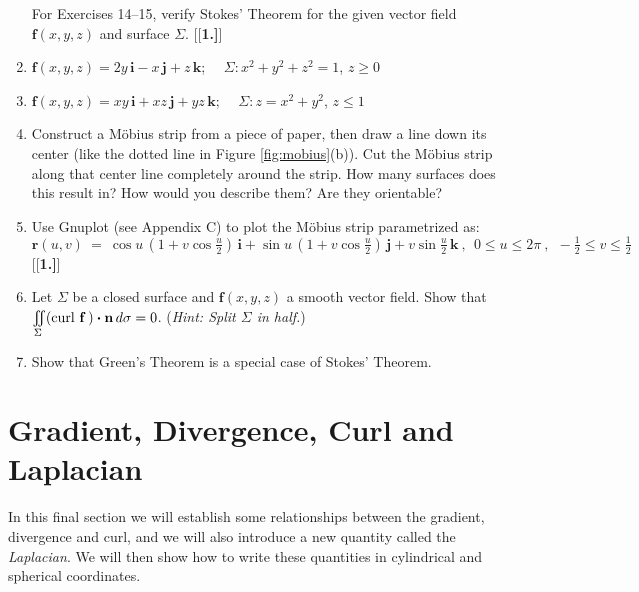 \begin{enumerate}[\bfseries 1.]
\par\noindent For Exercises 14--15, verify Stokes' Theorem for the given vector field $\mathbf{f}(x,y,z)$ and
surface $\Sigma$.
[{[\bfseries 1.]}]
 \item $\mathbf{f}(x,y,z) = 2y\,\mathbf{i} - x\,\mathbf{j} + z\,\mathbf{k}$; $\quad \Sigma: x^2 + y^2 + z^2 = 1$,
  $z \ge 0$
 \item $\mathbf{f}(x,y,z) = xy\,\mathbf{i} + xz\,\mathbf{j} + yz\,\mathbf{k}$; $\quad \Sigma: z=x^2 + y^2$, $z \le 1$
 \item Construct a M\"{o}bius strip from a piece of paper, then draw a line down its center (like the dotted line in
 Figure \ref{fig:mobius}(b)). Cut the M\"{o}bius strip along that center line completely around the strip. How many
 surfaces does this result in? How would you describe them? Are they orientable?
 \item Use Gnuplot (see Appendix C) to plot the M\"{o}bius strip parametrized as:
  \begin{displaymath}
   \mathbf{r}(u,v) ~=~ \cos u \,(1+v\cos \tfrac{u}{2})\,\mathbf{i} + \sin u \,(1+v\cos \tfrac{u}{2})\,\mathbf{j} +
    v\sin \tfrac{u}{2}\,\mathbf{k} ~,~~ 0 \le u \le 2\pi ~,~~ -\tfrac{1}{2} \le v \le \tfrac{1}{2}
  \end{displaymath}
[{[\bfseries 1.]}]
 \item Let $\Sigma$ be a closed surface and $\mathbf{f}(x,y,z)$ a smooth vector field. Show that\\
  $\iint\limits_{\Sigma} (\text{curl}~{\mathbf{f}}\,) \bm{\cdot} \mathbf{n}\,d\sigma = 0$. (\emph{Hint: Split $\Sigma$
  in half.})
 \item Show that Green's Theorem is a special case of Stokes' Theorem.
\end{enumerate}
\newpage
\section{Gradient, Divergence, Curl and Laplacian}
In this final section we will establish some relationships between the gradient, divergence and curl, and we will
also introduce a new quantity called the \emph{Laplacian}. We will then show how to write these quantities in
cylindrical and spherical coordinates.

